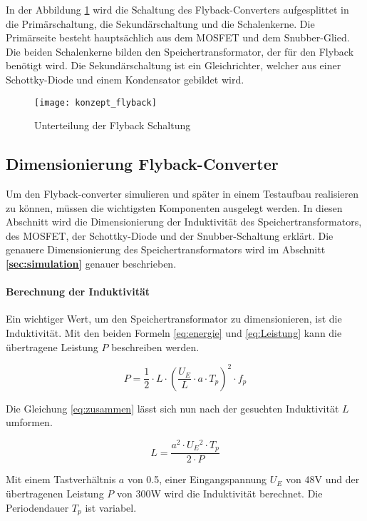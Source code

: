 In der Abbildung \ref{fig:konzept_flyback} wird die Schaltung des Flyback-Converters aufgesplittet in die Primärschaltung, die Sekundärschaltung und die Schalenkerne. Die Primärseite besteht hauptsächlich aus dem MOSFET und dem Snubber-Glied. Die beiden Schalenkerne bilden den Speichertransformator, der für den Flyback benötigt wird. Die Sekundärschaltung ist ein Gleichrichter, welcher aus einer Schottky-Diode und einem Kondensator gebildet wird.
\begin{figure}[h]
	\centering
	\texttt{[image: konzept\_flyback]}
	\caption{Unterteilung der Flyback Schaltung}\label{fig:konzept_flyback}
\end{figure}


\subsection{Dimensionierung Flyback-Converter}

Um den Flyback-converter simulieren und später in einem Testaufbau realisieren zu können, müssen die wichtigsten Komponenten ausgelegt werden. In diesen Abschnitt wird die Dimensionierung der Induktivität des Speichertransformators, des MOSFET, der Schottky-Diode und der Snubber-Schaltung erklärt. Die genauere Dimensionierung des Speichertransformators wird im Abschnitt  \textbf{\ref{sec:simulation} } genauer beschrieben.

\paragraph{Berechnung der Induktivität}
Ein wichtiger Wert, um den Speichertransformator zu dimensionieren, ist die Induktivität. Mit den beiden Formeln \ref{eq:energie} und \ref{eq:Leistung} kann die übertragene Leistung $ P $ beschreiben werden. 

\begin{equation}\label{eq:zusammen}
P = \frac{1}{2} \cdot L \cdot \left (\frac{U_{E}}{L}\cdot a \cdot T_{p}\right ) ^{2} \cdot f_{p}
\end{equation}

Die Gleichung \ref{eq:zusammen} lässt sich nun nach der gesuchten Induktivität $ L $ umformen.

\begin{equation}\label{eq:induktivität}
L = \frac{a^{2}\cdot U_{E}\!^{2}\cdot T_{p}}{2 \cdot P}
\end{equation}

Mit einem Tastverhältnis $ a $ von 0.5, einer Eingangspannung $ U_{E} $ von 48V und der übertragenen Leistung $ P $ von 300W wird die Induktivität berechnet. Die Periodendauer $ T_{p} $ ist variabel.


